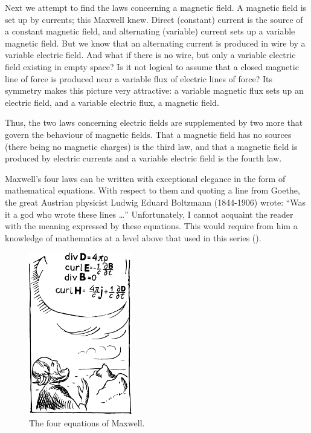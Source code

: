 Next we attempt to find the laws concerning a magnetic field. A magnetic field is set up by currents; this Maxwell knew. Direct (constant) current is the source of a constant magnetic field, and alternating (variable) current sets up a variable magnetic field. But we know that an alternating current is produced in wire by a variable electric field. And what if there is no wire, but only a variable electric field existing in empty space? Is it not logical to assume that a closed magnetic line of force is produced near a variable flux of electric lines of force? Its symmetry makes this picture very attractive: a variable magnetic flux sets up an electric field, and a variable electric flux, a magnetic field.

Thus, the two laws concerning electric fields are supplemented by two more that govern the behaviour of magnetic fields. That a magnetic field has no sources (there being no magnetic charges) is the third law, and that a magnetic field is produced by electric currents and a variable electric field is the fourth law.

Maxwell's four laws can be written with exceptional elegance in the form of mathematical equations. With respect to them and quoting a line from Goethe, the great Austrian physicist Ludwig Eduard Boltzmann (1844-1906) wrote: ``Was it a god who wrote these lines \ldots'' Unfortunately, I cannot acquaint the reader with the meaning expressed by these equations. This would require from him a knowledge of mathematics at a level above that used in this series ().

\begin{figure}[!ht]
\centering
\includegraphics[width=0.4\textwidth]{figures/fig-05-01.pdf}
\caption{The four equations of Maxwell.}
\label{fig-5.1}
\end{figure}


